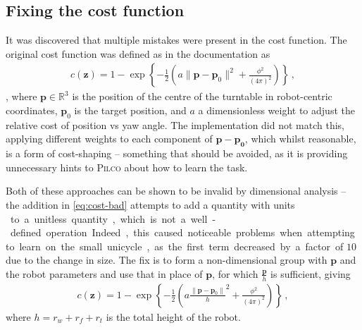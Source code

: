 \documentclass[main.tex]{subfiles}
\begin{document}
\subsection{Fixing the cost function}
	\label{sec:cost-function}
	It was discovered that multiple mistakes were present in the cost function. The original cost function was defined as in the documentation as
	\begin{align}
		c(\bm z) = 1 - \exp\left\{-\frac{1}{2}\left(a\|\bm{p} - \bm p_0\|^2+ \frac{\phi^2}{(4\pi)^2}\right)\right\} \,, \label{eq:cost-bad}
	\end{align},
	where $\bm{p} \in \mathbb{R}^3$ is the position of the centre of the turntable in robot-centric coordinates, $\bm{p}_0$ is the target position, and $a$ a dimensionless weight to adjust the relative cost of position vs yaw angle.
	The implementation did not match this, applying different weights to each component of $\bm{p} - \bm{p_0}$, which whilst reasonable, is a form of cost-shaping -- something that should be avoided, as it is providing unnecessary hints to \textsc{Pilco} about how to learn the task.

	Both of these approaches can be shown to be invalid by dimensional analysis -- the addition in \cref{eq:cost-bad} attempts to add a quantity with units \si{\meter\square} to a unitless quantity, which is not a well-defined operation.
	Indeed, this caused noticeable problems when attempting to learn on the small unicycle, as the first term decreased by a factor of $10$ due to the change in size.
	The fix is to form a non-dimensional group with $\bm{p}$ and the robot parameters and use that in place of $\bm{p}$, for which $\frac{\bm{p}}{h}$ is sufficient, giving
	\begin{align}
		c(\bm z) = 1 - \exp\left\{-\frac{1}{2}\left(a\frac{\|\bm{p} - \bm p_0\|}{h}^2+ \frac{\phi^2}{(4\pi)^2}\right)\right\} \,, \label{eq:correct-cost}
	\end{align}
	where $h = r_w + r_f + r_t$ is the total height of the robot.
\end{document}
